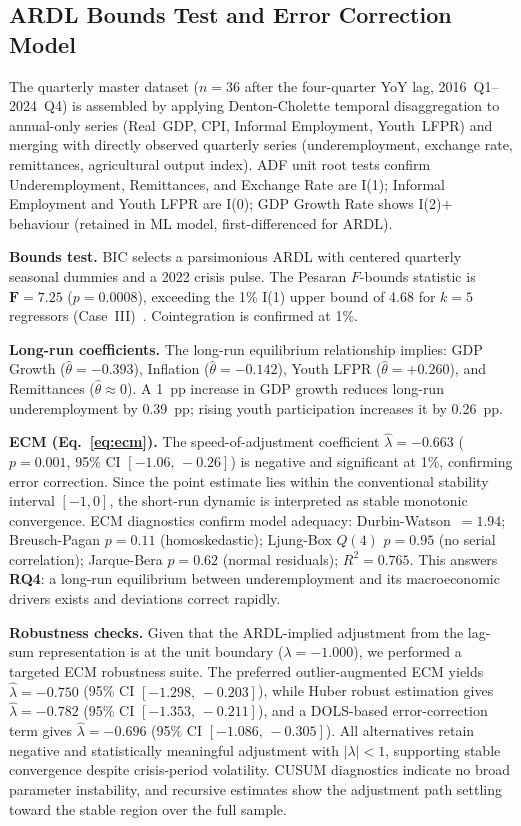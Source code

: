 \documentclass[sigconf]{acmart}
\begin{document}
\subsection{ARDL Bounds Test and Error Correction Model}
\label{sec:ardl}

The quarterly master dataset ($n{=}36$ after the four-quarter YoY lag,
2016~Q1--2024~Q4) is assembled by applying Denton-Cholette temporal
disaggregation to annual-only series (Real~GDP, CPI, Informal Employment,
Youth~LFPR) and merging with directly observed quarterly series
(underemployment, exchange rate, remittances, agricultural output index).
ADF unit root tests confirm Underemployment, Remittances, and Exchange Rate
are I(1); Informal Employment and Youth LFPR are I(0); GDP Growth Rate
shows I(2)$+$ behaviour (retained in ML model, first-differenced for ARDL).

\textbf{Bounds test.} BIC selects a parsimonious ARDL with centered
quarterly seasonal dummies and a 2022 crisis pulse. The Pesaran
$F$-bounds statistic is $\mathbf{F{=}7.25}$
($p{=}0.0008$), exceeding the 1\% I(1) upper bound of 4.68 for $k{=}5$
regressors (Case~III)~\cite{pesaran2001}. Cointegration is confirmed at 1\%.

\textbf{Long-run coefficients.} The long-run equilibrium relationship
implies: GDP Growth ($\hat\theta{=}{-}0.393$), Inflation
($\hat\theta{=}{-}0.142$), Youth LFPR ($\hat\theta{=}{+}0.260$), and
Remittances ($\hat\theta{\approx}0$). A 1~pp increase in GDP growth reduces
long-run underemployment by 0.39~pp; rising youth participation increases
it by 0.26~pp.

\textbf{ECM (Eq.~\ref{eq:ecm}).} The speed-of-adjustment coefficient
$\hat\lambda{=}{-}0.663$ ($p{=}0.001$, 95\% CI $[-1.06,\,-0.26]$) is
negative and significant at 1\%, confirming error correction. Since the
point estimate lies within the conventional stability interval $[-1,0]$,
the short-run dynamic is interpreted as stable monotonic convergence. ECM
diagnostics confirm model adequacy: Durbin-Watson~$=1.94$; Breusch-Pagan
$p{=}0.11$ (homoskedastic); Ljung-Box $Q(4)$ $p{=}0.95$ (no serial
correlation); Jarque-Bera $p{=}0.62$ (normal residuals); $R^2{=}0.765$.
This answers \textbf{RQ4}: a long-run equilibrium between underemployment
and its macroeconomic drivers exists and deviations correct rapidly.

\textbf{Robustness checks.} Given that the ARDL-implied adjustment from the
lag-sum representation is at the unit boundary ($\lambda{=}{-}1.000$), we
performed a targeted ECM robustness suite. The preferred outlier-augmented
ECM yields $\hat\lambda{=}{-}0.750$ (95\% CI $[-1.298,\,-0.203]$), while
Huber robust estimation gives $\hat\lambda{=}{-}0.782$ (95\% CI
$[-1.353,\,-0.211]$), and a DOLS-based error-correction term gives
$\hat\lambda{=}{-}0.696$ (95\% CI $[-1.086,\,-0.305]$). All alternatives
retain negative and statistically meaningful adjustment with $|\lambda|<1$,
supporting stable convergence despite crisis-period volatility. CUSUM
diagnostics indicate no broad parameter instability, and recursive estimates
show the adjustment path settling toward the stable region over the full
sample.
\end{document}
